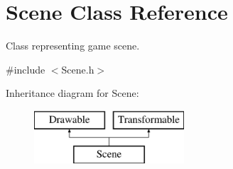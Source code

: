 \hypertarget{class_scene}{}\section{Scene Class Reference}
\label{class_scene}


Class representing game scene.  




{\ttfamily \#include $<$Scene.\+h$>$}

Inheritance diagram for Scene\+:\begin{figure}[H]
\begin{center}
\leavevmode
\includegraphics[height=2.000000cm]{class_scene}
\end{center}
\end{figure}
